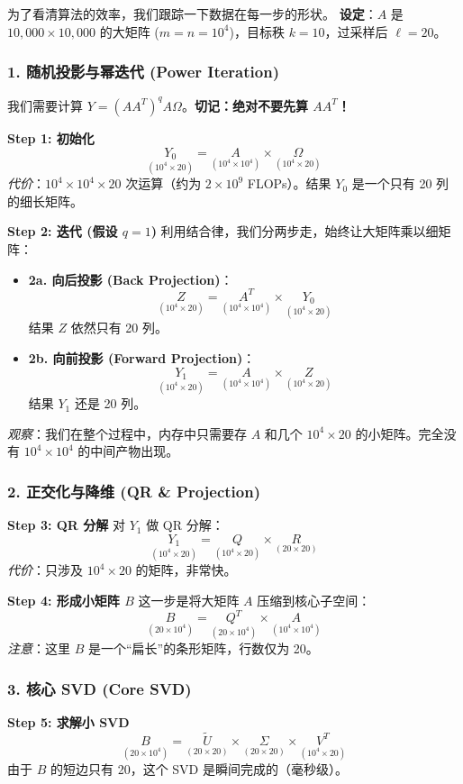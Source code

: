 \documentclass[11pt,a4paper]{ctexart}
\theoremstyle{definition}
\theoremstyle{remark}
\begin{document}
为了看清算法的效率，我们跟踪一下数据在每一步的形状。
\textbf{设定}：$A$ 是 $10,000 \times 10,000$ 的大矩阵 ($m=n=10^4$)，目标秩 $k=10$，过采样后 $\ell=20$。

\subsubsection*{1. 随机投影与幂迭代 (Power Iteration)}
我们需要计算 $Y = (AA^T)^q A \Omega$。\textbf{切记：绝对不要先算 $AA^T$！}

\textbf{Step 1: 初始化}
\[
\underset{(10^4 \times 20)}{Y_0} = \underset{(10^4 \times 10^4)}{A} \times \underset{(10^4 \times 20)}{\Omega}
\]
\textit{代价}：$10^4 \times 10^4 \times 20$ 次运算（约为 $2 \times 10^9$ FLOPs）。结果 $Y_0$ 是一个只有 20 列的细长矩阵。

\textbf{Step 2: 迭代 (假设 $q=1$)}
利用结合律，我们分两步走，始终让大矩阵乘以细矩阵：
\begin{itemize}
    \item \textbf{2a. 向后投影 (Back Projection)}：
    \[
    \underset{(10^4 \times 20)}{Z} = \underset{(10^4 \times 10^4)}{A^T} \times \underset{(10^4 \times 20)}{Y_0}
    \]
    结果 $Z$ 依然只有 20 列。
    \item \textbf{2b. 向前投影 (Forward Projection)}：
    \[
    \underset{(10^4 \times 20)}{Y_1} = \underset{(10^4 \times 10^4)}{A} \times \underset{(10^4 \times 20)}{Z}
    \]
    结果 $Y_1$ 还是 20 列。
\end{itemize}
\textit{观察}：我们在整个过程中，内存中只需要存 $A$ 和几个 $10^4 \times 20$ 的小矩阵。完全没有 $10^4 \times 10^4$ 的中间产物出现。

\subsubsection*{2. 正交化与降维 (QR \& Projection)}
\textbf{Step 3: QR 分解}
对 $Y_1$ 做 QR 分解：
\[
\underset{(10^4 \times 20)}{Y_1} = \underset{(10^4 \times 20)}{Q} \times \underset{(20 \times 20)}{R}
\]
\textit{代价}：只涉及 $10^4 \times 20$ 的矩阵，非常快。

\textbf{Step 4: 形成小矩阵 $B$}
这一步是将大矩阵 $A$ 压缩到核心子空间：
\[
\underset{(20 \times 10^4)}{B} = \underset{(20 \times 10^4)}{Q^T} \times \underset{(10^4 \times 10^4)}{A}
\]
\textit{注意}：这里 $B$ 是一个“扁长”的条形矩阵，行数仅为 20。

\subsubsection*{3. 核心 SVD (Core SVD)}
\textbf{Step 5: 求解小 SVD}
\[
\underset{(20 \times 10^4)}{B} = \underset{(20 \times 20)}{\tilde{U}} \times \underset{(20 \times 20)}{\Sigma} \times \underset{(10^4 \times 20)}{V^T}
\]
由于 $B$ 的短边只有 20，这个 SVD 是瞬间完成的（毫秒级）。
\end{document}
